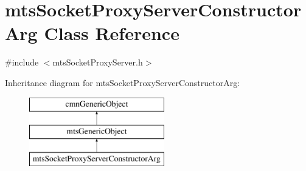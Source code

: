 \hypertarget{classmts_socket_proxy_server_constructor_arg}{\section{mts\-Socket\-Proxy\-Server\-Constructor\-Arg Class Reference}
\label{classmts_socket_proxy_server_constructor_arg}
}


{\ttfamily \#include $<$mts\-Socket\-Proxy\-Server.\-h$>$}

Inheritance diagram for mts\-Socket\-Proxy\-Server\-Constructor\-Arg\-:\begin{figure}[H]
\begin{center}
\leavevmode
\includegraphics[height=3.000000cm]{d6/d47/classmts_socket_proxy_server_constructor_arg}
\end{center}
\end{figure}
